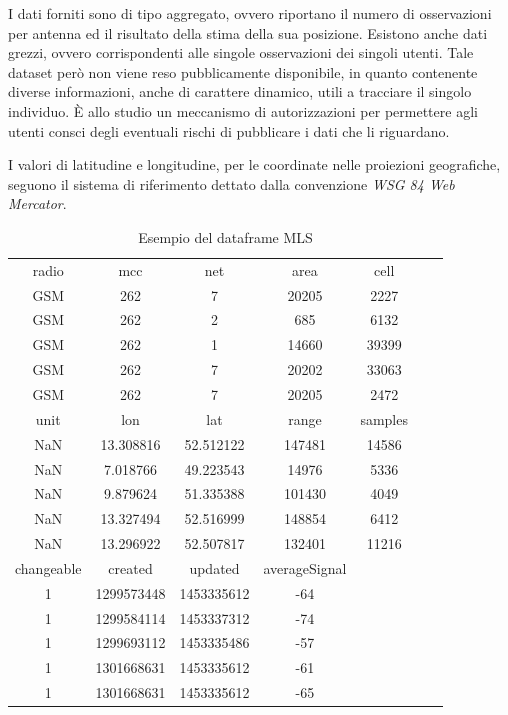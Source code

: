 I dati forniti sono di tipo aggregato, ovvero riportano il numero di osservazioni per antenna ed il risultato della stima della sua posizione. Esistono anche dati grezzi, ovvero corrispondenti alle singole osservazioni dei singoli utenti. Tale dataset però non viene reso pubblicamente disponibile, in quanto contenente diverse informazioni, anche di carattere dinamico, utili a tracciare il singolo individuo. È allo studio un meccanismo di autorizzazioni per permettere agli utenti consci degli eventuali rischi di pubblicare i dati che li riguardano.

I valori di latitudine e longitudine, per le coordinate nelle proiezioni geografiche, seguono il sistema di riferimento dettato dalla convenzione \emph{WSG 84 Web Mercator}.

\begin{table}[ht!]
\centering
\caption{Esempio del dataframe MLS}
	\begin{tabular}{ccccccc}
	\toprule
radio 	&mcc 	&net &area 	&cell \\	
GSM 		&262 	&7 	&20205 	&2227 \\	
GSM 		&262 	&2 	&685		&6132 \\	
GSM 		&262 	&1 	&14660 	&39399 \\	
GSM 		&262 	&7 	&20202 	&33063 \\
GSM 		&262 	&7 	&20205 	&2472 \\
\midrule
unit 		 &lon	&lat 		&range 	&samples \\
NaN		&13.308816 	&52.512122	&147481 	&14586 \\
NaN		&7.018766 	&49.223543	&14976 	&5336 \\
NaN		&9.879624 	&51.335388	&101430 	&4049 \\	
NaN		&13.327494	&52.516999	&148854 	&6412 \\	
NaN		&13.296922	&52.507817	&132401 	&11216 \\	
\midrule
changeable 	&created 		&updated 		&averageSignal\\
1 			&1299573448 	&1453335612 	&-64\\
1 			&1299584114 	&1453337312 	&-74\\
1 			&1299693112 	&1453335486 	&-57\\
1 			&1301668631 	&1453335612 	&-61\\
1 			&1301668631 	&1453335612 	&-65\\
\bottomrule
	\end{tabular}
\label{tab:esempiodati}
\end{table}

